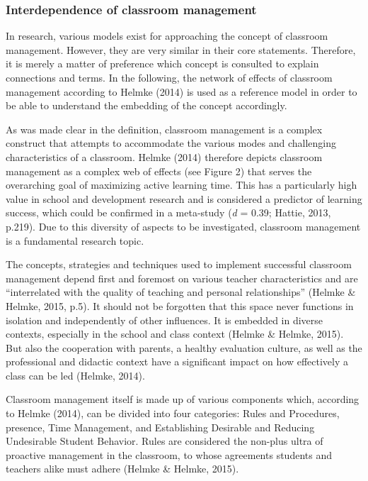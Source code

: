 \documentclass[
  man]{apa6}
\begin{document}
\hypertarget{interdependence-of-classroom-management}{%
\subsubsection{Interdependence of classroom management}\label{interdependence-of-classroom-management}}

In research, various models exist for approaching the concept of classroom management. However, they are very similar in their core statements. Therefore, it is merely a matter of preference which concept is consulted to explain connections and terms. In the following, the network of effects of classroom management according to Helmke (2014) is used as a reference model in order to be able to understand the embedding of the concept accordingly.

As was made clear in the definition, classroom management is a complex construct that attempts to accommodate the various modes and challenging characteristics of a classroom. Helmke (2014) therefore depicts classroom management as a complex web of effects (see Figure 2) that serves the overarching goal of maximizing active learning time. This has a particularly high value in school and development research and is considered a predictor of learning success, which could be confirmed in a meta-study (\emph{d} = 0.39; Hattie, 2013, p.219). Due to this diversity of aspects to be investigated, classroom management is a fundamental research topic.

The concepts, strategies and techniques used to implement successful classroom management depend first and foremost on various teacher characteristics and are ``interrelated with the quality of teaching and personal relationships'' (Helmke \& Helmke, 2015, p.5). It should not be forgotten that this space never functions in isolation and independently of other influences. It is embedded in diverse contexts, especially in the school and class context (Helmke \& Helmke, 2015). But also the cooperation with parents, a healthy evaluation culture, as well as the professional and didactic context have a significant impact on how effectively a class can be led (Helmke, 2014).

Classroom management itself is made up of various components which, according to Helmke (2014), can be divided into four categories: Rules and Procedures, presence, Time Management, and Establishing Desirable and Reducing Undesirable Student Behavior. Rules are considered the non-plus ultra of proactive management in the classroom, to whose agreements students and teachers alike must adhere (Helmke \& Helmke, 2015).
\end{document}
